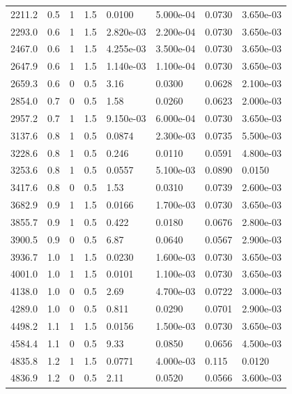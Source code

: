 \documentclass[preview]{standalone}
\begin{document}
{{\begin{tabular}{L{1.2cm}C{1.2cm} C{0.3cm}C{0.5cm} C{1.4cm}C{1.4cm} C{1.4cm}C{1.4cm}}
  2211.2  &   0.5  & 1     & 1.5 &  0.0100  & 5.000e-04  & 0.0730 &  3.650e-03   \\ 
  2293.0  &   0.6  & 1     & 1.5 &  2.820e-03  & 2.200e-04  & 0.0730 &  3.650e-03   \\ 
  2467.0  &   0.6  & 1     & 1.5 &  4.255e-03  & 3.500e-04  & 0.0730 &  3.650e-03   \\ 
  2647.9  &   0.6  & 1     & 1.5 &  1.140e-03  & 1.100e-04  & 0.0730 &  3.650e-03   \\ 
  2659.3  &   0.6  & 0     & 0.5 &  3.16  & 0.0300  & 0.0628 &  2.100e-03   \\ 
  2854.0  &   0.7  & 0     & 0.5 &  1.58  & 0.0260  & 0.0623 &  2.000e-03   \\ 
  2957.2  &   0.7  & 1     & 1.5 &  9.150e-03  & 6.000e-04  & 0.0730 &  3.650e-03   \\ 
  3137.6  &   0.8  & 1     & 0.5 &  0.0874  & 2.300e-03  & 0.0735 &  5.500e-03   \\ 
  3228.6  &   0.8  & 1     & 0.5 &  0.246  & 0.0110  & 0.0591 &  4.800e-03   \\ 
  3253.6  &   0.8  & 1     & 0.5 &  0.0557  & 5.100e-03  & 0.0890 &  0.0150   \\ 
  3417.6  &   0.8  & 0     & 0.5 &  1.53  & 0.0310  & 0.0739 &  2.600e-03   \\ 
  3682.9  &   0.9  & 1     & 1.5 &  0.0166  & 1.700e-03  & 0.0730 &  3.650e-03   \\ 
  3855.7  &   0.9  & 1     & 0.5 &  0.422  & 0.0180  & 0.0676 &  2.800e-03   \\ 
  3900.5  &   0.9  & 0     & 0.5 &  6.87  & 0.0640  & 0.0567 &  2.900e-03   \\ 
  3936.7  &   1.0  & 1     & 1.5 &  0.0230  & 1.600e-03  & 0.0730 &  3.650e-03   \\ 
  4001.0  &   1.0  & 1     & 1.5 &  0.0101  & 1.100e-03  & 0.0730 &  3.650e-03   \\ 
  4138.0  &   1.0  & 0     & 0.5 &  2.69  & 4.700e-03  & 0.0722 &  3.000e-03   \\ 
  4289.0  &   1.0  & 0     & 0.5 &  0.811  & 0.0290  & 0.0701 &  2.900e-03   \\ 
  4498.2  &   1.1  & 1     & 1.5 &  0.0156  & 1.500e-03  & 0.0730 &  3.650e-03   \\ 
  4584.4  &   1.1  & 0     & 0.5 &  9.33  & 0.0850  & 0.0656 &  4.500e-03   \\ 
  4835.8  &   1.2  & 1     & 1.5 &  0.0771  & 4.000e-03  & 0.115 &  0.0120   \\ 
  4836.9  &   1.2  & 0     & 0.5 &  2.11  & 0.0520  & 0.0566 &  3.600e-03   \\ 

\end{tabular}}}
\end{document}

